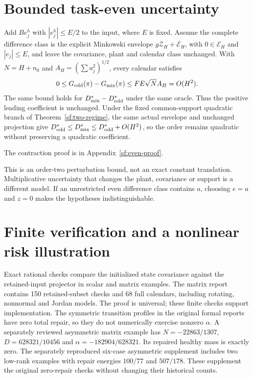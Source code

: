 \section{Bounded task-even uncertainty}\label{sf:even-section}
\begin{corollary}\label{sf:even}
Add $Be_j^h$ with $|e_j^h|\le E/2$ to the input, where $E$ is fixed.
Assume the complete difference class is the explicit Minkowski envelope
$g\mathcal Z_H+\mathcal E_H$, with $0\in\mathcal E_H$ and
$|e_j|\le E$, and leave the covariance, plant and calendar class unchanged.
With $N=H+n_0$ and $A_H=(\sum a_j^2)^{1/2}$, every calendar satisfies
\[
0\le G_{\rm odd}(\pi)-G_{\rm mix}(\pi)
\le FE\sqrt N A_H=O(H^2).
\]
The same bound holds for $D_{\rm mix}^*-D_{\rm odd}^*$ under the same oracle.
Thus the positive leading coefficient is unchanged. Under the fixed
common-support quadratic branch of Theorem~\ref{sf:two-regime}, the same
actual envelope and unchanged projection give
$D_{\rm odd}^*\le D_{\rm mix}^*\le D_{\rm odd}^*+O(H^2)$,
so the order remains quadratic without preserving a quadratic coefficient.
\end{corollary}
The contraction proof is in Appendix~\ref{sf:even-proof}.

This is an order-two perturbation bound, not an exact constant translation.
Multiplicative uncertainty that changes the plant, covariance or support is a
different model. If an unrestricted even difference class contains $a$,
choosing $e=a$ and $z=0$ makes the hypotheses indistinguishable.

\section{Finite verification and a nonlinear risk illustration}\label{sf:verification}
Exact rational checks compare the initialized state covariance against the
retained-input projector in scalar and matrix examples. The matrix report
contains 150 retained-subset checks and 68 full calendars, including rotating,
nonnormal and Jordan models. The proof is universal; these finite checks
support implementation. The symmetric transition profiles in the original
formal reports have zero total repair, so they do not numerically exercise
nonzero $\alpha$. A separately reviewed asymmetric matrix example has
$N=-22863/1307$, $D=628321/10456$ and $\alpha=-182904/628321$.
Its repaired healthy mass is exactly zero. The separately reproduced
six-case asymmetric supplement includes two low-rank examples with repair
energies $100/77$ and $507/178$. These supplement the original zero-repair
checks without changing their historical counts.

